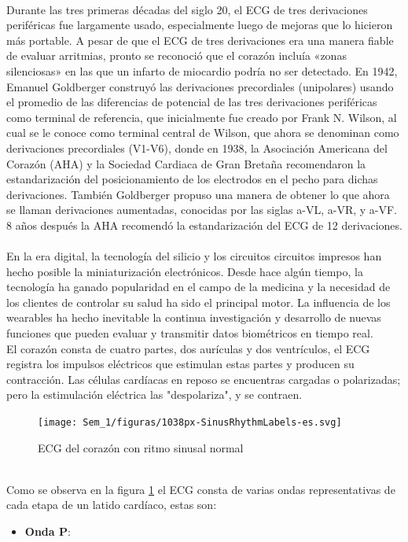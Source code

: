 \documentclass[spanish,11pt,letterpaper,oneside]{memoir}
\begin{document}
    \\
    Durante las tres primeras décadas del siglo 20, el ECG de tres derivaciones periféricas fue largamente usado, especialmente luego de mejoras que lo hicieron más portable. A pesar de que el ECG de tres derivaciones era una manera fiable de evaluar arritmias, pronto se reconoció que el corazón incluía «zonas silenciosas» en las que un infarto de miocardio podría no ser detectado. En 1942, Emanuel Goldberger construyó las derivaciones precordiales (unipolares) usando el promedio de las diferencias de potencial de las tres derivaciones periféricas como terminal de referencia, que inicialmente fue creado por Frank N. Wilson, al cual se le conoce como terminal central de Wilson, que ahora se denominan como derivaciones precordiales (V1-V6), donde en 1938, la Asociación Americana del Corazón (AHA) y la Sociedad Cardiaca de Gran Bretaña recomendaron la estandarización del posicionamiento de los electrodos en el pecho para dichas derivaciones. También Goldberger propuso una manera de obtener lo que ahora se llaman derivaciones aumentadas, conocidas por las siglas a-VL, a-VR, y a-VF. 8 años después la AHA recomendó la estandarización del ECG de 12 derivaciones. \cite{vincent2022}\\
    \\
    En la era digital, la tecnología del silicio y los circuitos circuitos impresos han hecho posible la miniaturización electrónicos. Desde hace algún tiempo, la tecnología ha ganado popularidad en el campo de la medicina y la necesidad de los clientes de controlar su salud ha sido el principal motor. La influencia de los wearables ha hecho inevitable la continua investigación y desarrollo de nuevas funciones que pueden evaluar y transmitir datos biométricos en tiempo real. \\

    
    
    
    
    
	El corazón consta de cuatro partes, dos aurículas y dos ventrículos, el ECG registra los impulsos eléctricos que estimulan estas partes y producen su contracción. Las células cardíacas en reposo se encuentras cargadas o polarizadas; pero la estimulación eléctrica las "despolariza", y se contraen. \\
	\begin{figure}[h]
		\centering
		\texttt{[image: Sem\_1/figuras/1038px-SinusRhythmLabels-es.svg]}
		\caption{ECG del corazón con ritmo sinusal normal}
		\label{fig:ECGSinusal}
	\end{figure}
	\\
	Como se observa en la figura \ref{fig:ECGSinusal} el ECG consta de varias ondas representativas de cada etapa de un latido cardíaco, estas son: \\
	\begin{itemize}
		\item \textbf{Onda P}: 
	\end{itemize}
\end{document}

